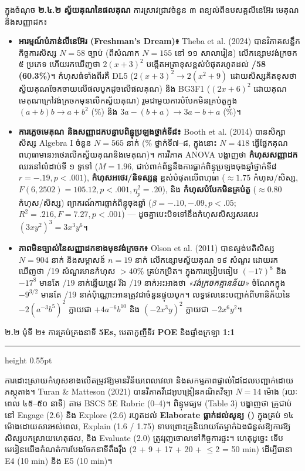 \documentclass[a4paper,12pt]{article}
\newcommand{\en}[1]{{\TimesEn #1}}
\newcommand{\enbf}[1]{{\TimesEn\textbf{#1}}}
\newcommand{\subsectitle}[1]{{\muol\fontsize{11.5pt}{18.5pt}\selectfont #1}}
\newcommand{\subsec}[1]{%
  \Needspace{1.7cm}%
  \vspace{3pt}%
  \subsectitle{#1}\par%
  \vspace{-2pt}%
  {\color{black}\hrule height 0.55pt}%
  \vspace{3pt}%
}
\begin{document}
ក្នុងចំណុច \textbf{២.៤.២ ស្វ័យគុណនៃផលគុណ} ការស្រាវជ្រាវចំនួន ៣ ពន្យល់ពីឧបសគ្គលីនេអ៊ែរ មេគុណ និងសញ្ញាដក៖
\begin{itemize}[leftmargin=0.65cm]
  \item \textbf{អារម្មណ៍បំភាន់លីនេអ៊ែរ \en{(Freshman's Dream)}៖} \en{Theba et al. (2024)} បានវិភាគសន្លឹកកិច្ចការសិស្ស \en{$N = 58$} ច្បាប់ (ពីសំណាក \en{$N = 155$} នៅ ១១ សាលារៀន) លើកន្សោមវង់ក្រចក ៥ ប្រភេទ ហើយរកឃើញថា $2(x+3)^2$ បង្កើតអត្រាខុសខ្ពស់បំផុតរហូតដល់ \textbf{\en{35/58 (60.3\%)}}។ កំហុសធំទាំងពីរគឺ \en{DL5} ($2(x+3)^2 \to 2(x^2+9)$ ដោយសិស្សគិតខុសថាស្វ័យគុណចែកចាយលើផលបូកដូចលើផលគុណ) និង \en{BG3F1} ($(2x+6)^2$ ដោយគុណមេគុណក្រៅវង់ក្រចកមុនលើកស្វ័យគុណ) រួមជាមួយការបំបែកមិនគ្រប់តួក្នុង $(a+b)b \to a+b^2$ (\en{27.6\%}) និង $3a-(b+a)\to 3a-b+a$ (\en{44.8\%})។
  \item \textbf{ការភ្លេចមេគុណ និងសញ្ញាដកបន្ទាបពិន្ទុប្រឡងថ្នាក់ទី៨៖} \en{Booth et al. (2014)} បានសិក្សាសិស្ស \en{Algebra I} ចំនួន \en{$N = 565$} នាក់ (\en{35\%} ថ្នាក់ទី៧--៨, ក្នុងនោះ \en{$N = 418$} ធ្វើផ្នែកគុណពហុធាមានអថេរលើកស្វ័យគុណនិងមេគុណ)។ ការវិភាគ \en{ANOVA} បង្ហាញថា \textbf{កំហុសសញ្ញាដក} ឈរនៅលំដាប់ទី ១ ទូទៅ (\en{$M = 1.96$}, ជាប់ពាក់ព័ន្ធនឹងការធ្លាក់ពិន្ទុប្រឡងចុងឆ្នាំថ្នាក់ទី៨ \en{$r = -.19, p < .001$}), \textbf{កំហុសអថេរ/និទស្សន្ត} ខ្ពស់បំផុតលើពហុធា (\en{$\approx 1.75$} កំហុស/សិស្ស, \en{$F(6, 2502) = 105.12, p < .001, \eta_p^2 = .20$}), និង \textbf{កំហុសបំបែកមិនគ្រប់តួ} (\en{$\approx 0.80$} កំហុស/សិស្ស) ព្យាករណ៍ការធ្លាក់ពិន្ទុចុងឆ្នាំ (\en{$\beta = -.10, -.09, p < .05$; $R^2 = .216, F = 7.27, p < .001$}) — ដូចគ្នាបេះបិទទៅនឹងកំហុសសិស្សសរសេរ $(3xy^2)^3 = 3x^3y^6$។
  \item \textbf{ភាពមិនច្បាស់នៃសញ្ញាដកខាងមុខវង់ក្រចក៖} \en{Olson et al. (2011)} បានស្ទង់មតិសិស្ស \en{$N = 904$} នាក់ និងសម្ភាសន៍ \en{$n = 19$} នាក់ លើកន្សោមស្វ័យគុណ ១៩ សំណួរ ដោយរកឃើញថា \en{4/19} សំណួរមានកំហុស \en{$> 40\%$} គ្រប់កម្រិត។ ក្នុងការប្រៀបធៀប $(-17)^8$ និង $-17^8$ មានតែ \en{5/19} នាក់ឆ្លើយត្រូវ រីឯ \en{6/19} នាក់អះអាងថា \textit{«វង់ក្រចកគ្មានន័យ»} ចំណែកក្នុង $-9^{3/2}$ មានតែ \en{2/19} នាក់ប៉ុណ្ណោះអានត្រូវជាចំនួនផ្ទុយបូក។ លទ្ធផលនេះបញ្ជាក់ពីហានិភ័យនៃ $-2(a^{-3}b^5)^2$ ក្លាយជា $+4a^{-6}b^{10}$ និង $(-2x^3y)^2$ ក្លាយជា $-2x^6y^2$។
\end{itemize}

\subsec{២\enbf{.}២ មុំទី ២៖ ការគ្រប់គ្រងនាទី \enbf{5Es,} មេតាកូញីទីវ \enbf{POE} និងផ្ទាំងក្រឡា \enbf{1:1}}

ការដោះស្រាយកំហុសខាងលើតម្រូវឱ្យមានវិន័យពេលវេលា និងសកម្មភាពផ្ទាល់ដៃដែលបញ្ជាក់ដោយភស្តុតាង។ \en{Turan \& Matteson (2021)} បានវិភាគវីដេអូបង្រៀនគណិតវិទ្យា \en{$N = 14$} ម៉ោង (រយៈពេល ៤៥--៥០ នាទី) តាម \en{BSCS 5E Rubric (0--4)}។ ពិន្ទុមធ្យម (\en{Table 3}) បង្ហាញថា គ្រូជាប់នៅ \en{Engage (2.6)} និង \en{Explore (2.6)} រហូតដល់ \textbf{\en{Elaborate} ធ្លាក់ដល់សូន្យ (\en{0})} ក្នុងគ្រប់ ១៤ ម៉ោងដោយសារអស់ពេល, \en{Explain (1.6 / 1.75)} ទាបព្រោះគ្រូនិយាយតែម្នាក់ឯងជំនួសឱ្យការឱ្យសិស្សបកស្រាយហេតុផល, និង \en{Evaluate (2.0)} ត្រូវរុញចោលទៅកិច្ចការផ្ទះ។ ហេតុដូច្នេះ ទើបមេរៀនយើងកំណត់ការបែងចែកនាទីតឹងរ៉ឹង \en{(2 + 9 + 17 + 20 + $\le$2 = 50 min)} ដើម្បីធានា \en{E4 (10 min)} និង \en{E5 (10 min)}។
\end{document}

